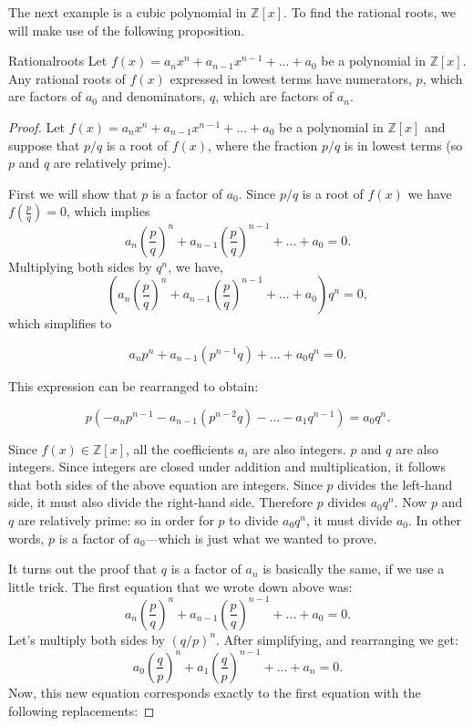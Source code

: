 The next example is a cubic polynomial in $\mathbb{Z}[x]$. To find the rational roots, we will make use of the following proposition.

\begin{prop}{Rationalroots}
Let $f(x) = a_{n}x^n+a_{n-1}x^{n-1}+...+a_{0}$ be a polynomial in $\mathbb{Z}[x]$. Any rational roots of $f(x)$ expressed in lowest terms have numerators, $p$, which are factors of $a_{0}$ and denominators, $q$, which are factors of $a_{n}$.
\end {prop}

\begin{proof}{}
Let $f(x) = a_{n}x^n+a_{n-1}x^{n-1}+...+a_{0}$ be a polynomial in $\mathbb{Z}[x]$ and suppose that $p/q$ is a root  of $f(x)$,  where the fraction  $p/q$ is in lowest terms (so $p$ and $q$ are relatively prime).

First we will show that $p$ is a factor of  $a_{0}$. Since $p/q$ is a root of $f(x)$ we have  $f\left(\frac {p}{q}\right)=0$, which implies
$$a_{n}\left(\frac {p}{q}\right)^n+a_{n-1}\left(\frac {p}{q}\right)^{n-1}+...+a_{0}=0.$$
Multiplying both sides by $q^n$, we have,
$$\left(a_{n}\left(\frac {p}{q}\right)^n+a_{n-1}\left(\frac {p}{q}\right)^{n-1}+...+a_{0}\right)q^n=0,$$
which simplifies to

$$a_{n}p^n+a_{n-1}(p^{n-1}q)+...+a_{0}q^n=0.$$

This expression can be rearranged to obtain:

$$p\left(-a_{n}p^{n-1}-a_{n-1}(p^{n-2}q)-...-a_{1}q^{n-1}\right)=a_{0}q^n.$$

Since $f(x) \in \mathbb{Z}[x]$, all the coefficients $a_i$ are also integers.  $p$ and $q$ are also integers. Since integers are closed under addition and multiplication, it follows that both sides of the above equation are integers. Since $p$ divides the left-hand side, it must also divide the right-hand side.  Therefore $p$ divides $a_{0}q^n$. Now $p$ and $q$ are relatively prime: so in order for $p$ to divide $a_{0}q^n$, it must divide $a_0$. 
In other words, $p$ is a factor of  $a_{0}$---which is just what we wanted to prove.

It turns out the proof that $q$ is a factor of  $a_{n}$ is basically the same, if we use a little trick.  The first equation that we wrote down above was:
$$a_{n}\left(\frac {p}{q}\right)^n+a_{n-1}\left(\frac {p}{q}\right)^{n-1}+...+a_{0}=0.$$
Let's multiply both sides by $(q/p)^n$.  After simplifying, and rearranging we get:
$$a_{0}\left(\frac {q}{p}\right)^n+a_{1}\left(\frac {q}{p}\right)^{n-1}+...+a_{n}=0.$$
Now, this new equation corresponds exactly to the first equation with the following replacements:


\end{proof}
